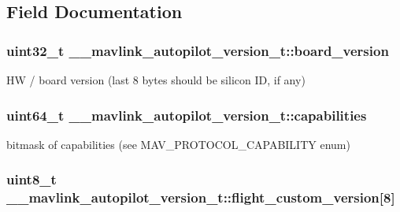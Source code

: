 \subsection{Field Documentation}
\hypertarget{struct____mavlink__autopilot__version__t_aa94e68859adae94fa27c66e437e33c57}{
\subsubsection[{board\+\_\+version}]{\setlength{\rightskip}{0pt plus 5cm}uint32\+\_\+t \+\_\+\+\_\+mavlink\+\_\+autopilot\+\_\+version\+\_\+t\+::board\+\_\+version}}\label{struct____mavlink__autopilot__version__t_aa94e68859adae94fa27c66e437e33c57}


H\+W / board version (last 8 bytes should be silicon I\+D, if any) 

\hypertarget{struct____mavlink__autopilot__version__t_abdb6dbb248808dbed7e556c33de391f0}{
\subsubsection[{capabilities}]{\setlength{\rightskip}{0pt plus 5cm}uint64\+\_\+t \+\_\+\+\_\+mavlink\+\_\+autopilot\+\_\+version\+\_\+t\+::capabilities}}\label{struct____mavlink__autopilot__version__t_abdb6dbb248808dbed7e556c33de391f0}


bitmask of capabilities (see M\+A\+V\+\_\+\+P\+R\+O\+T\+O\+C\+O\+L\+\_\+\+C\+A\+P\+A\+B\+I\+L\+I\+T\+Y enum) 

\hypertarget{struct____mavlink__autopilot__version__t_adbbff1b8dad6961b08fe54b3a56fc35f}{
\subsubsection[{flight\+\_\+custom\+\_\+version}]{\setlength{\rightskip}{0pt plus 5cm}uint8\+\_\+t \+\_\+\+\_\+mavlink\+\_\+autopilot\+\_\+version\+\_\+t\+::flight\+\_\+custom\+\_\+version\mbox{[}8\mbox{]}}}\label{struct____mavlink__autopilot__version__t_adbbff1b8dad6961b08fe54b3a56fc35f}


